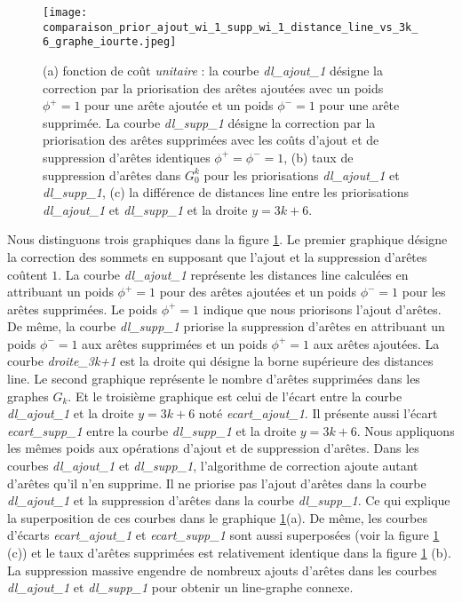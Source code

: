 \begin{figure}[htb!] 
\centering
\texttt{[image: comparaison\_prior\_ajout\_wi\_1\_supp\_wi\_1\_distance\_line\_vs\_3k\_6\_graphe\_iourte.jpeg]}
\caption{  (a) fonction de co\^ut {\em unitaire} : la courbe {\em dl\_ajout\_1} d\'esigne la correction par la priorisation des ar\^etes ajout\'ees avec un poids $\phi^{+} = 1$  pour une ar\^ete ajout\'ee et un poids $\phi^{-} = 1$  pour une ar\^ete supprim\'ee.
 La courbe {\em dl\_supp\_1} d\'esigne la correction par la priorisation des ar\^etes  supprim\'ees avec les co\^uts d'ajout et de suppression d'ar\^etes identiques $\phi^{+} = \phi^{-} = 1$,
 (b) taux de suppression d'ar\^etes dans  $G_0^k$ pour les priorisations  {\em dl\_ajout\_1} et  {\em dl\_supp\_1},
 (c) la diff\'erence de distances line entre les priorisations {\em dl\_ajout\_1} et  {\em dl\_supp\_1}  et la droite $y=3k+6$. }
\label{priorAjout1Supp1} 
\end{figure}

Nous distinguons trois graphiques dans la figure \ref{priorAjout1Supp1}.
Le premier graphique d\'esigne la correction des sommets en supposant que  l'ajout et la suppression d'ar\^etes co\^utent $1$.
La courbe {\em dl\_ajout\_1} repr\'esente les distances line calcul\'ees en attribuant un poids $\phi^{+} = 1$ pour des ar\^etes ajout\'ees et un poids $\phi^{-} = 1$ pour les ar\^etes supprim\'ees. Le poids $\phi^{+} = 1$ indique que nous priorisons l'ajout d'ar\^etes.
De m\^eme, la courbe {\em dl\_supp\_1} priorise la suppression d'ar\^etes en attribuant  un poids $\phi^{-} = 1$ aux ar\^etes supprim\'ees et un poids $\phi^{+} = 1$ aux ar\^etes ajout\'ees.
La courbe {\em droite\_3k+1} est la droite qui d\'esigne la borne sup\'erieure des distances line.
Le second graphique repr\'esente le nombre d'ar\^etes supprim\'ees dans les graphes $G_k$.
Et le troisi\`eme graphique est celui de l'\'ecart entre la courbe  {\em dl\_ajout\_1}  et la droite $y = 3k+6$  not\'e {\em ecart\_ajout\_1}. Il pr\'esente aussi l'\'ecart {\em  ecart\_supp\_1} entre la courbe  {\em dl\_supp\_1}  et la droite $y = 3k+6$.
\newline
Nous appliquons les m\^emes poids aux op\'erations d'ajout et de suppression d'ar\^etes. Dans les courbes {\em dl\_ajout\_1} et {\em dl\_supp\_1}, l'algorithme de correction ajoute autant d'ar\^etes qu'il n'en supprime. Il ne priorise pas l'ajout d'ar\^etes dans la courbe  {\em dl\_ajout\_1}  et la suppression  d'ar\^etes dans la courbe  {\em dl\_supp\_1}. Ce qui explique la superposition de ces courbes dans le graphique \ref{priorAjout1Supp1}(a). 
De m\^eme, les courbes d'\'ecarts {\em ecart\_ajout\_1} et {\em  ecart\_supp\_1} sont aussi superpos\'ees (voir la figure  \ref{priorAjout1Supp1} (c)) et le taux d'ar\^etes supprim\'ees est relativement identique dans la figure \ref{priorAjout1Supp1} (b).
La suppression massive engendre de nombreux ajouts d'ar\^etes dans les courbes {\em dl\_ajout\_1} et {\em dl\_supp\_1} pour obtenir un line-graphe connexe.

